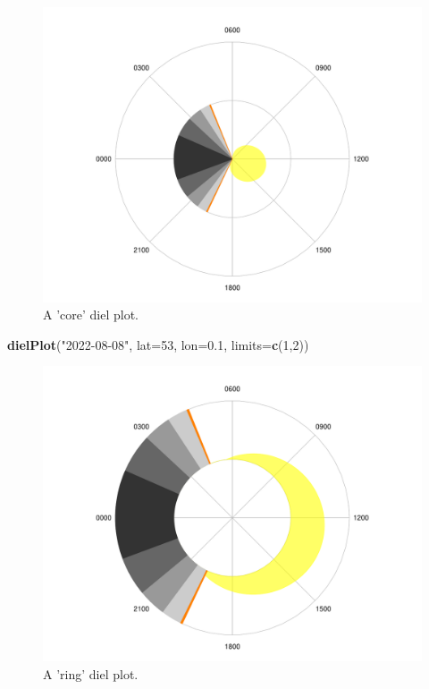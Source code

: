 \documentclass[
]{book}
\newenvironment{Shaded}{\begin{snugshade}}{\end{snugshade}}
\newcommand{\AttributeTok}[1]{\textcolor[rgb]{0.13,0.29,0.53}{#1}}
\newcommand{\DecValTok}[1]{\textcolor[rgb]{0.00,0.00,0.81}{#1}}
\newcommand{\FloatTok}[1]{\textcolor[rgb]{0.00,0.00,0.81}{#1}}
\newcommand{\FunctionTok}[1]{\textcolor[rgb]{0.13,0.29,0.53}{\textbf{#1}}}
\newcommand{\NormalTok}[1]{#1}
\newcommand{\StringTok}[1]{\textcolor[rgb]{0.31,0.60,0.02}{#1}}
\begin{document}
\begin{figure}

{\centering \includegraphics[width=0.9\linewidth]{_main_files/figure-latex/diel-plot-core-1} 

}

\caption{A 'core' diel plot.}\label{fig:diel-plot-core}
\end{figure}

\begin{Shaded}
\begin{Highlighting}[]
\FunctionTok{dielPlot}\NormalTok{(}\StringTok{"2022{-}08{-}08"}\NormalTok{, }\AttributeTok{lat=}\DecValTok{53}\NormalTok{, }\AttributeTok{lon=}\FloatTok{0.1}\NormalTok{, }\AttributeTok{limits=}\FunctionTok{c}\NormalTok{(}\DecValTok{1}\NormalTok{,}\DecValTok{2}\NormalTok{))}
\end{Highlighting}
\end{Shaded}

\begin{figure}

{\centering \includegraphics[width=0.9\linewidth]{_main_files/figure-latex/diel-plot-ring-1} 

}

\caption{A 'ring' diel plot.}\label{fig:diel-plot-ring}
\end{figure}
\end{document}
